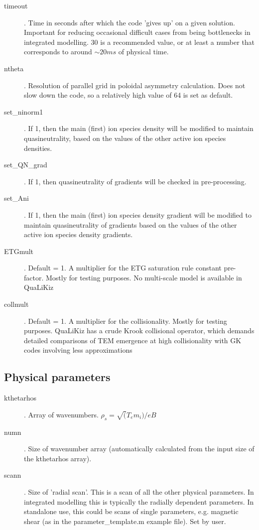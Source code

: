 \documentclass{article}
\begin{document}
\begin{description}
\item[timeout]. Time in seconds after which the code 'gives up' on a given solution. Important for reducing occasional difficult cases from being bottlenecks in integrated modelling. 30 is a recommended value, or at least a number that corresponds to around $\sim20ms$ of physical time.
\item[ntheta]. Resolution of parallel grid in poloidal asymmetry calculation. Does not slow down the code, so a relatively high value of 64 is set as default.
\item[set\_ninorm1]. If 1, then the main (first) ion species density will be modified to maintain quasineutrality, based on the values of the other active ion species densities.
\item[set\_QN\_grad]. If 1, then quasineutrality of gradients will be checked in pre-processing.
\item[set\_Ani]. If 1, then the main (first) ion species density gradient will be modified to maintain quasineutrality of gradients based on the values of the other active ion species density gradients.
\item[ETGmult].  Default = 1. A multiplier for the ETG saturation rule constant pre-factor. Mostly for testing purposes. No multi-scale model is available in QuaLiKiz
\item[collmult]. Default = 1. A multiplier for the collisionality. Mostly for testing purposes. QuaLiKiz has a crude Krook collisional operator, which demands detailed comparisons of TEM emergence at high collisionality with GK codes involving less approximations
\end{description}

\subsection{Physical parameters}
\begin{description}
\item[kthetarhos]. Array of wavenumbers. $\rho_s=\sqrt(T_em_i)/eB$
\item[numn]. Size of wavenumber array (automatically calculated from the input size of the kthetarhos array).
\item[scann]. Size of 'radial scan'. This is a scan of all the other physical parameters. In integrated modelling this is typically the radially dependent parameters. In standalone use, this could be scans of single parameters, e.g. magnetic shear (as in the parameter\_template.m example file). Set by user.
\end{description}
\end{document}

